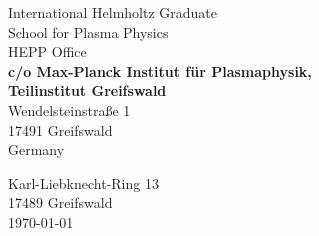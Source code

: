 \documentclass[11pt,a4paper]{moderncv}
\begin{document}
	\vspace*{1.0cm}
	\begin{minipage}{0.6\textwidth}
		\begin{flushleft}
			International Helmholtz Graduate\\
			School for Plasma Physics\\[0.1cm]
			HEPP Office\\[0.1cm]
			{\bfseries{\color{firstnamecolor}%
					c/o Max-Planck Institut für Plasmaphysik,\\[0.1cm]%
					Teilinstitut Greifswald
			}}\\[0.2cm]
			Wendelsteinstraße 1\\
			17491 Greifswald\\
			Germany\\
		\end{flushleft}
	\end{minipage}
	\hfill
	\begin{minipage}{0.3\textwidth}
		\begin{flushright}
			\vspace*{1.3cm}
			Karl-Liebknecht-Ring 13\\
			17489 Greifswald\\[1.0cm]
			\today
		\end{flushright}
	\end{minipage}
	
\end{document}
